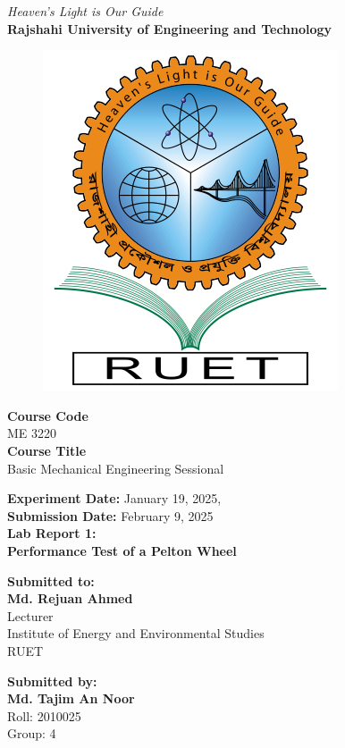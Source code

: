 \vspace*{\fill}
\begin{center}

    \emph{Heaven's Light is Our Guide} \\
    \textbf{Rajshahi University of Engineering and Technology} \\

    \begin{figure}[H]
        \centering
        \includegraphics[scale=.34]{images/RUET_logo.png}
        \label{fig:ruet_logo}
    \end{figure}
    \vspace{5mm}

    \textbf{Course Code}\\
    ME 3220\\
    \vspace{3mm}
    \textbf{Course Title}\\
    Basic Mechanical Engineering Sessional

    \vspace{5mm}
    \textbf{Experiment Date:} {January 19, 2025},\\
    \textbf{Submission Date:} {February 9, 2025}\\

    \vspace{5mm}
    \textbf{Lab Report 1: \\
        Performance Test of a Pelton Wheel}

    \vspace{10mm}

    \textbf{Submitted to:} \\
    \textbf{Md. Rejuan Ahmed} \\
    Lecturer \\
    Institute of Energy and Environmental Studies \\
    RUET
    \vspace{8mm}

    \textbf{Submitted by:} \\
    \textbf{Md. Tajim An Noor} \\
    Roll: 2010025\\
    Group: 4

\end{center}
\vspace*{\fill}
